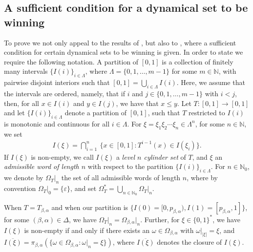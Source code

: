 \documentclass[a4paper,reqno,10pt]{amsart}
\begin{document}
%
%
%
\subsection{A sufficient condition for a dynamical set to be winning}\label{sec:HY}
%
%
%

To prove  we not only appeal to the results of \cite{G1990,Palmer79}, but also to \cite[Theorem 2.1]{HY}, where a sufficient condition for certain dynamical sets to be winning is given. In order to state \cite[Theorem 2.1]{HY} we require the following notation.  A partition of $[0,1]$ is a collection of finitely many intervals $\{ I(i) \}_{i \in \Lambda}$, where $\Lambda = \{0, 1, \ldots, m-1\}$ for some $m \in \mathbb{N}$, with pairwise disjoint interiors such that $[0,1] = \bigcup_{i \in \Lambda} I(i)$. Here, we assume that the intervals are ordered, namely, that if $i$ and $j \in \{0, 1, \ldots, m-1\}$ with $i < j$, then, for all $x \in I(i)$ and $y \in I(j)$, we have that $x \leq y$.  Let $T \colon [0, 1] \to [0,1]$ and let $\{ I(i) \}_{i \in \Lambda}$ denote a partition of $[0, 1]$, such that $T$ restricted to $I(i)$ is monotonic and continuous for all $i \in \Lambda$. For $\xi = \xi_{1} \xi_{2} \cdots \xi_{n} \in \Lambda^{n}$, for some $n \in \mathbb{N}$, we set
    \begin{align*}
        I(\xi) = \bigcap_{i = 1}^{n} \ \{ x \in [0, 1] \colon T^{i-1}(x) \in I(\xi_{i}) \}.
    \end{align*}
If $I(\xi)$ is non-empty, we call $I(\xi)$ a \textsl{level $n$ cylinder set} of $T$, and $\xi$ an \textsl{admissible word of length $n$} with respect to the partition $\{ I(i)\}_{i \in \Lambda}$.  For $n \in \mathbb{N}_{0}$, we denote by $\Omega_{T}\vert_{n}$ the set of all admissible words of length $n$, where by convention $\Omega_{T}\vert_{0} = \{ \varepsilon \}$, and set $\Omega_{T}^{*} = \bigcup_{n \in \mathbb{N}_{0}}  \Omega_{T}\vert_{n}$.  

When $T = T_{\beta, \alpha}$ and when our partition is $\{ I(0) = [0,p_{\beta, \alpha}), I(1)=[p_{\beta, \alpha},1] \}$, for some $(\beta, \alpha) \in \Delta$, we have $\Omega_{T}\vert_{n} =\Omega_{\beta, \alpha}\vert_{n}$.  Further, for $\xi \in \{0, 1\}^{*}$, we have $I(\xi)$ is non-empty if and only if there exists an $\omega \in \Omega_{\beta, \alpha}$ with $\omega\vert_{\lvert \xi \rvert} = \xi$, and $\overline{I(\xi)} = \pi_{\beta, \alpha}( \{ \omega \in \Omega_{\beta, \alpha} \colon \omega\vert_{n} = \xi \} )$, where $\overline{I(\xi)}$ denotes the closure of $I(\xi)$.
\end{document}
